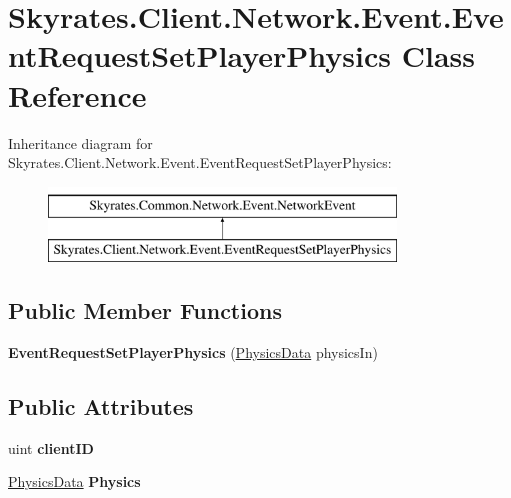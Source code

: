 \hypertarget{class_skyrates_1_1_client_1_1_network_1_1_event_1_1_event_request_set_player_physics}{\section{Skyrates.\-Client.\-Network.\-Event.\-Event\-Request\-Set\-Player\-Physics Class Reference}
\label{class_skyrates_1_1_client_1_1_network_1_1_event_1_1_event_request_set_player_physics}
}
Inheritance diagram for Skyrates.\-Client.\-Network.\-Event.\-Event\-Request\-Set\-Player\-Physics\-:\begin{figure}[H]
\begin{center}
\leavevmode
\includegraphics[height=2.000000cm]{class_skyrates_1_1_client_1_1_network_1_1_event_1_1_event_request_set_player_physics}
\end{center}
\end{figure}
\subsection*{Public Member Functions}
\begin{DoxyCompactItemize}
\item 
\hypertarget{class_skyrates_1_1_client_1_1_network_1_1_event_1_1_event_request_set_player_physics_af7b51739e0eeadc934a17a3316b4b103}{{\bfseries Event\-Request\-Set\-Player\-Physics} (\hyperlink{class_skyrates_1_1_common_1_1_a_i_1_1_physics_data}{Physics\-Data} physics\-In)}\label{class_skyrates_1_1_client_1_1_network_1_1_event_1_1_event_request_set_player_physics_af7b51739e0eeadc934a17a3316b4b103}

\end{DoxyCompactItemize}
\subsection*{Public Attributes}
\begin{DoxyCompactItemize}
\item 
\hypertarget{class_skyrates_1_1_client_1_1_network_1_1_event_1_1_event_request_set_player_physics_a2a61c3dd1252870907f686098d098b3a}{uint {\bfseries client\-I\-D}}\label{class_skyrates_1_1_client_1_1_network_1_1_event_1_1_event_request_set_player_physics_a2a61c3dd1252870907f686098d098b3a}

\item 
\hypertarget{class_skyrates_1_1_client_1_1_network_1_1_event_1_1_event_request_set_player_physics_a634e95d2b9518a9591dbb4c0212a42a4}{\hyperlink{class_skyrates_1_1_common_1_1_a_i_1_1_physics_data}{Physics\-Data} {\bfseries Physics}}\label{class_skyrates_1_1_client_1_1_network_1_1_event_1_1_event_request_set_player_physics_a634e95d2b9518a9591dbb4c0212a42a4}

\end{DoxyCompactItemize}
